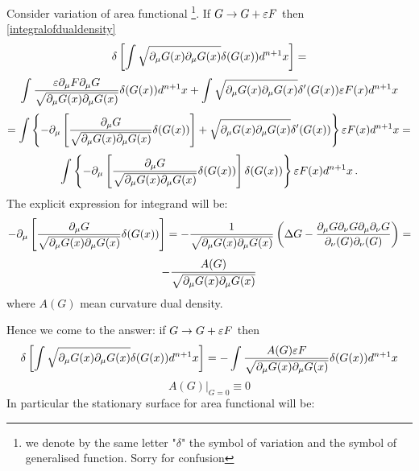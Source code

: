 \documentclass[12pt]{article}
\theoremstyle{theorem}
\begin{document}
 Consider variation of area functional
\footnote{we denote by the same letter
"$\delta$" the symbol of variation and the symbol of generalised function.
 Sorry for confusion}. If $G\to G+{\varepsilon} F$ then \eqref{integralofdualdensity}
\begin{equation}\label{variationofareafunctional}
    {\delta \left[\int \sqrt{\partial_\mu G(x)\partial_\mu G(x)}\delta(G(x))d^{n+1}x\right]}=
\end{equation}
                    $$
  \int
         {{\varepsilon}\partial_\mu F\partial_\mu G\over \sqrt{\partial_\mu G(x)\partial_\mu G(x)}}\delta(G(x))d^{n+1}x+
         \int \sqrt{\partial_\mu G(x)\partial_\mu G(x)}\delta'(G(x)){\varepsilon} F(x)d^{n+1}x
                    $$
                        $$
 =                     \int
                       \left\{
                         -\partial_\mu
                         \left[
{\partial_\mu G\over \sqrt{\partial_\mu G(x)\partial_\mu G(x)}}\delta(G(x))
                         \right]+
                         \sqrt{\partial_\mu G(x)\partial_\mu G(x)}\delta'(G(x))
                       \right\}
                       {\varepsilon} F(x)d^{n+1}x=
                        $$
                        $$
                        \int
                       \left\{
                       -\partial_\mu
                         \left[
{\partial_\mu G\over \sqrt{\partial_\mu G(x)\partial_\mu G(x)}}\delta(G(x))
                         \right]\delta(G(x))
                       \right\}
                       {\varepsilon} F(x)d^{n+1}x\,.
                        $$
The explicit expression for integrand will be:
                        $$
                        -\partial_\mu
                         \left[
{\partial_\mu G\over \sqrt{\partial_\mu G(x)\partial_\mu G(x)}}\delta(G(x))
                         \right]=
-{1\over \sqrt{\partial_\mu G(x)\partial_\mu G(x)}}
                            \left(
                          \Delta G-{\partial_\mu G\partial_\nu G \partial_\mu\partial_\nu G\over \partial_\nu (G)\partial_\nu (G)}
                            \right)=
                           $$
                           $$
                           -{A(G)\over \sqrt{\partial_\mu G(x)\partial_\mu G(x)}}
                           $$
where $A(G)$ mean curvature dual density.

Hence we come to the answer: if $G\to G+{\varepsilon} F$ then
                     \begin{equation}\label{variationofareameandensity}
{\delta \left[\int \sqrt{\partial_\mu G(x)\partial_\mu G(x)}\delta(G(x))d^{n+1}x\right]}=
-\int  {A(G){\varepsilon}F\over \sqrt{\partial_\mu G(x)\partial_\mu G(x)}}\delta(G(x))d^{n+1}x
\end{equation}
\begin{equation}\label{stationarysurface}
    A(G)\vert_{G=0}\equiv 0
\end{equation}In particular the stationary surface for area functional will be:
\end{document}
